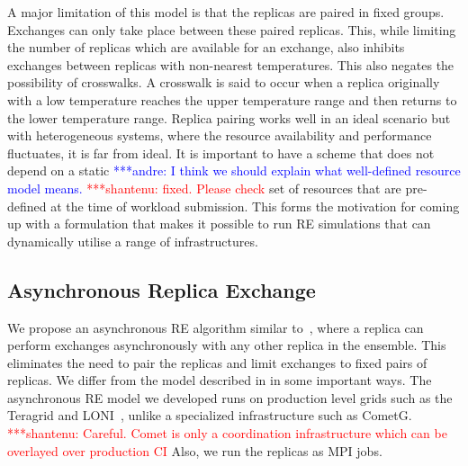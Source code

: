\documentclass{rspublic}
\newcommand{\jhanote}[1]{ {\textcolor{red} { ***shantenu: #1 }}}
\newcommand{\alnote}[1]{ {\textcolor{blue} { ***andre: #1 }}}
\newcommand{\alnote}[1]{}
\newcommand{\jhanote}[1]{}
\begin{document}
A major limitation of this model is that the replicas are paired in fixed groups. 
Exchanges can only take place between these paired replicas.
This, while limiting the number of replicas which are available for an exchange, also inhibits exchanges between replicas with non-nearest temperatures. This also negates the possibility of crosswalks. A crosswalk is said to occur when a replica originally with a low temperature reaches the upper temperature range and then returns to the lower temperature range. %
Replica pairing works well in an ideal scenario but with heterogeneous
systems, where the resource availability and performance fluctuates,
it is far from ideal. It is important to have a scheme that does not
depend on a static \alnote{I think we should explain what well-defined
  resource model means.} \jhanote{fixed. Please check} set of
resources that are pre-defined at the time of workload submission.
This forms the motivation for coming up with a formulation that makes
it possible to run RE simulations that can dynamically utilise a range
of infrastructures.
  

  
\subsection{Asynchronous Replica Exchange}


We propose an asynchronous RE algorithm similar
to~\citep{parashar_arepex}, where a replica can perform exchanges
asynchronously with any other replica in the ensemble. This eliminates
the need to pair the replicas and limit exchanges to fixed pairs of
replicas. We differ from the model described in \cite{parashar_arepex}
in some important ways. The asynchronous RE model we developed runs on
production level grids such as the Teragrid and LONI~\citep{LONI_web},
unlike a specialized infrastructure such as CometG.
\jhanote{Careful. Comet is only a coordination infrastructure which
  can be overlayed over production CI} Also, we run the replicas as
MPI jobs.
\end{document}
